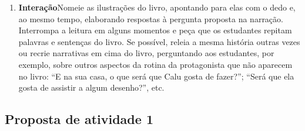 \documentclass[11pt]{extarticle}
\begin{document}
\begin{enumerate}
\item \textbf{Interação}\quad Nomeie as ilustrações 
do livro, apontando para elas com o dedo e, ao mesmo tempo, elaborando respostas à pergunta proposta na narração. Interrompa a leitura em alguns momentos e peça que 
os estudantes repitam palavras e sentenças do livro. Se possível, 
releia a mesma história outras vezes ou recrie narrativas em cima do livro, perguntando aos estudantes, por exemplo, sobre outros aspectos da rotina da protagonista que não aparecem no livro: ``E na sua casa, o que será que Calu gosta de fazer?''; ``Será que ela gosta de assistir a algum desenho?'', etc.
\end{enumerate}


\subsection{Proposta de atividade 1}

\end{document}
